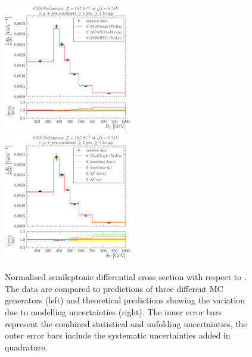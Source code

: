 \begin{figure}[!htbp]
	\centering
  	{\includegraphics[width=0.5\textwidth]{measurement/ST/central/normalised_xsection_combined_different_generators}}\hfill
  	{\includegraphics[width=0.5\textwidth]{measurement/ST/central/normalised_xsection_combined_systematics_shifts}}
    \caption[Normalised semileptonic \ttbar differential cross section with respect to \ST]{Normalised semileptonic
      \ttbar differential cross section with respect to \ST. The data are compared to predictions of three different MC
      generators (left) and theoretical predictions showing the variation due to modelling uncertainties (right). The
      inner error bars represent the combined statistical and unfolding uncertainties, the outer error bars include the
      systematic uncertainties added in quadrature.}
    \label{fig:results_ST_combined}
\end{figure}

